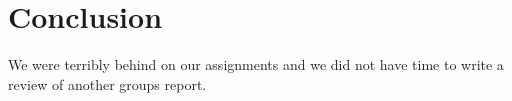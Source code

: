 \section{Conclusion}
We were terribly behind on our assignments and we did not have time to write a review of another groups report.
\newpage